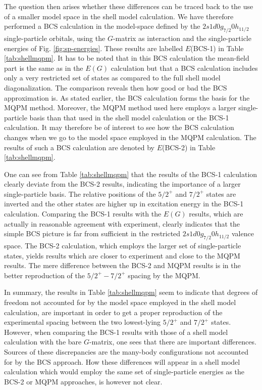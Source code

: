 The question then arises whether these differences can be traced back to
the use of a smaller model space in the shell model calculation.
We have therefore performed a BCS calculation
in the model-space defined by the 
$2s1d0g_{7/2}0h_{11/2}$ single-particle orbitals, using the 
$G$-matrix as interaction and the 
single-particle energies of Fig. \ref{fig:sp-energies}. These results 
are labelled $E$(BCS-1) in Table \ref{tab:shellmqpm}. It has to be
noted that in this BCS calculation the mean-field part is the same 
as in the $E(G)$ calculation but that
a  BCS calculation includes only a very restricted set of states
as compared to the full shell model diagonalization.
The comparison reveals then how good or bad the BCS approximation is.
As stated earlier, the BCS calculation forms the basis for the
MQPM method. Moreover, the MQPM method used here employs 
a larger single-particle basis than that used in the shell model calculation
or the BCS-1 calculation. It may therefore be of interest to see
how the BCS calculation changes when we go to the model space
employed in the MQPM calculation. The results of such a BCS calculation
are denoted by  $E$(BCS-2) in Table \ref{tab:shellmqpm}.

One can see from Table \ref{tab:shellmqpm} that the results of 
the BCS-1 calculation clearly
deviate from the BCS-2 results, indicating the importance
of a larger single-particle basis. The relative positions of the 
$5/2^+$ and $7/2^+$ states are inverted and the other states 
are higher up in excitation energy in the BCS-1 calculation. 
Comparing the BCS-1 results with the 
$E(G)$ results, which are actually in reasonable
agreement with experiment, clearly indicates that the
simple BCS picture is far from sufficient in the restricted
$2s1d0g_{7/2}0h_{11/2}$ valence space.
The BCS-2 calculation, which employs the larger set of single-particle
states, yields results which are closer to experiment and
close to the MQPM results. The mere difference between the BCS-2
and MQPM results is in the better 
reproduction of the $5/2^+-7/2^+$ spacing by the MQPM.

In summary, the results in Table \ref{tab:shellmqpm} seem to indicate that
degrees of freedom not accounted for by the model space employed
in the shell model calculation, are important in order to get 
a proper reproduction of the experimental  spacing between
the two lowest-lying $5/2^+$ and $7/2^+$ states. 
However, when comparing the BCS-1 results with those of a shell model
calculation with the bare $G$-matrix, one sees that there are 
important differences. Sources of these discrepancies
are the many-body configurations not accounted for by the
BCS approach. How these differences will appear in a shell model
calculation which would employ the same set of single-particle
energies as the BCS-2 or MQPM approaches, is however not clear. 
  
